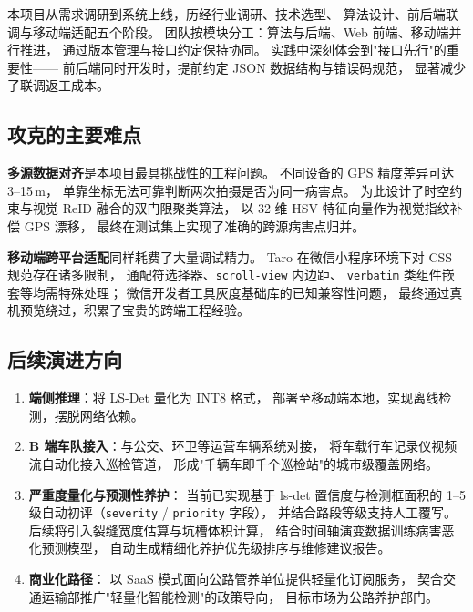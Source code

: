 \documentclass[UTF8, a4paper, fontset=ubuntu]{ctexart}
\begin{document}
  本项目从需求调研到系统上线，历经行业调研、技术选型、
  算法设计、前后端联调与移动端适配五个阶段。
  团队按模块分工：算法与后端、Web 前端、移动端并行推进，
  通过版本管理与接口约定保持协同。
  实践中深刻体会到"接口先行"的重要性——
  前后端同时开发时，提前约定 JSON 数据结构与错误码规范，
  显著减少了联调返工成本。

  \subsection{攻克的主要难点}

  \textbf{多源数据对齐}是本项目最具挑战性的工程问题。
  不同设备的 GPS 精度差异可达 3--15\,m，
  单靠坐标无法可靠判断两次拍摄是否为同一病害点。
  为此设计了时空约束与视觉 ReID 融合的双门限聚类算法，
  以 32 维 HSV 特征向量作为视觉指纹补偿 GPS 漂移，
  最终在测试集上实现了准确的跨源病害点归并。

  \textbf{移动端跨平台适配}同样耗费了大量调试精力。
  Taro 在微信小程序环境下对 CSS 规范存在诸多限制，
  通配符选择器、\texttt{scroll-view} 内边距、
  \texttt{verbatim} 类组件嵌套等均需特殊处理；
  微信开发者工具灰度基础库的已知兼容性问题，
  最终通过真机预览绕过，积累了宝贵的跨端工程经验。

  \subsection{后续演进方向}

  \begin{enumerate}[label=\arabic*., itemsep=2pt]
      \item \textbf{端侧推理}：将 LS-Det 量化为 INT8 格式，
      部署至移动端本地，实现离线检测，摆脱网络依赖。

      \item \textbf{B 端车队接入}：与公交、环卫等运营车辆系统对接，
      将车载行车记录仪视频流自动化接入巡检管道，
      形成"千辆车即千个巡检站"的城市级覆盖网络。

      \item \textbf{严重度量化与预测性养护}：
      当前已实现基于 ls-det 置信度与检测框面积的 1--5 级自动初评（\texttt{severity} / \texttt{priority} 字段），
      并结合路段等级支持人工覆写。后续将引入裂缝宽度估算与坑槽体积计算，
      结合时间轴演变数据训练病害恶化预测模型，
      自动生成精细化养护优先级排序与维修建议报告。

      \item \textbf{商业化路径}：
      以 SaaS 模式面向公路管养单位提供轻量化订阅服务，
      契合交通运输部推广"轻量化智能检测"的政策导向，
      目标市场为公路养护部门。
  \end{enumerate}
\end{document}
